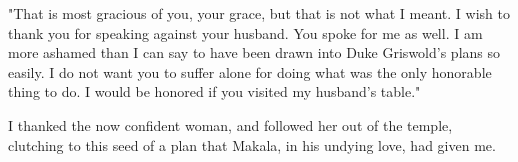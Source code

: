 \documentclass{article}
\begin{document}
"That is most gracious of you, your grace, but that is not what I meant. I wish to thank you for speaking against your husband. You spoke for me as well. I am more ashamed than I can say to have been drawn into Duke Griswold's plans so easily. I do not want you to suffer alone for doing what was the only honorable thing to do. I would be honored if you visited my husband's table." 

I thanked the now confident woman, and followed her out of the temple, clutching to this seed of a plan that Makala, in his undying love, had given me. 

\begin{comment}
\vspace{.5cm}

Over the course of the next few weeks, I found my courage again. Leila introduced me to a host of potential allies in Deyalorn's court. Malia worked tirelessly with me on my manuscript. With her help, I could finish the work by the solstice. I learned that Master Alyosus's son, Velo, a gifted captain in Deyalorn's guard was a devoted uncle, a relationship he eagerly shared with my twins. Master Alyosus encouraged me to study the effects of the mushrooms again. He showed a gentle amusement to my confession of my angry mass slaughter of my subjects.

"I do not believe young women should involve themselves in politics." He said when I asked him why he had a sudden change of heart. "Now it is not a matter for the politicians to decide based on power and influence, but for the Towers to decided based on the merits of  the case." 

Sophia cast me a brief warning glance from her needlepoint. I obeyed and kept my laughter to myself. There were plently of examples of Joris women involved in politics, the Regent Consort being the first example that came to mind. Furthermore, while the debate had passed to the confines of the Towers, and the merits of proper study would certainly factor more strongly in the final outcomes than it had in the hands of the dukes and the priests, power and influence would still play a large role. The support of a Joris of Deyalorn's Tower would help me get my views heard. If I could get Master Alerio's support as well, they would certainly be listened to. The montors for Deyalorn's Tower had not been appointed yet. I would have to make friends with the general overseeing Deyalorn.


\end{comment}
\end{document}

